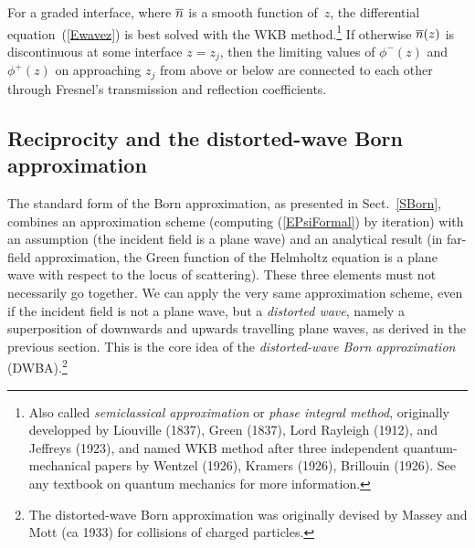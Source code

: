 For a graded interface, where $\overline{n}$ is a smooth function of~$z$,
the differential equation~(\ref{Ewavez}) is best solved
with the WKB method.\footnote
{Also called \textit{semiclassical approximation} or
\textit{phase integral method},
originally developped
by Liouville (1837), Green (1837), Lord Rayleigh (1912), and Jeffreys (1923),
and named WKB method after three independent
quantum-mechanical papers by
Wentzel (1926), Kramers (1926), Brillouin (1926).
See any textbook on quantum mechanics for more information.}
If otherwise $\overline{n}(z)$ is discontinuous at some interface $z=z_j$,
then the limiting values of $\phi^-(z)$ and $\phi^+(z)$
on approaching $z_j$ from above or below
are connected to each other through Fresnel's
transmission and reflection coefficients.

\subsection{Reciprocity and the distorted-wave Born approximation}


The standard form of the Born approximation,
as presented in Sect.~\ref{SBorn},
combines an approximation scheme
(computing (\ref{EPsiFormal}) by iteration)
with an assumption (the incident field is a plane wave)
and an analytical result
(in far-field approximation,
the Green function of the Helmholtz equation is a plane wave
with respect to the locus of scattering).
These three elements must not necessarily go together.
We can apply the very same approximation scheme,
even if the incident field is not a plane wave,
but a \textit{distorted wave},
namely a superposition of downwards and upwards travelling plane waves,
as derived in the previous section.
This is the core idea
of the \textit{distorted-wave Born approximation} (DWBA).\footnote
{The distorted-wave Born approximation
was originally devised by Massey and Mott (ca 1933)
for collisions of charged particles.}

